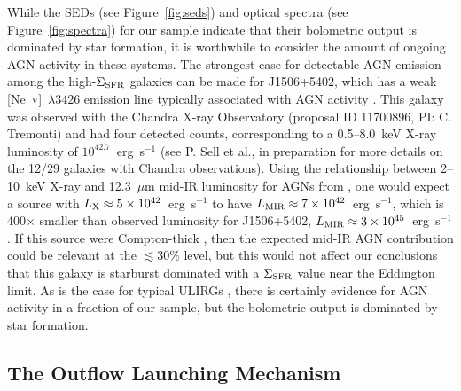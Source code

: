 \documentclass[apj]{emulateapj}
\newcommand{\nev}{[\textrm{Ne}~\textsc{v}]}
\newcommand{\sigmasfr}{\Sigma_{\textnormal{\scriptsize{SFR}}}}
\begin{document}
While the SEDs (see Figure~\ref{fig:seds}) and optical spectra (see
Figure~\ref{fig:spectra}) for our sample indicate that their
bolometric output is dominated by star formation, it is worthwhile to
consider the amount of ongoing AGN activity in these systems.  The
strongest case for detectable AGN emission among the high-$\sigmasfr$
galaxies can be made for J1506+5402, which has a weak
\nev~$\lambda3426$ emission line typically associated with AGN
activity \citep[e.g., ][]{abe08}.  This galaxy was observed with the
Chandra X-ray Observatory (proposal ID 11700896, PI: C. Tremonti) and
had four detected counts, corresponding to a 0.5--8.0~keV X-ray
luminosity of $10^{42.7}$~erg~s$^{-1}$ (see P. Sell et al., in
preparation for more details on the 12/29 galaxies with Chandra
observations).  Using the relationship between 2--10~keV X-ray and
12.3~$\mu$m mid-IR luminosity for AGNs from \citet{gan09}, one would
expect a source with
$L_{\textnormal{\scriptsize{X}}}\approx5\times10^{42}$~erg~s$^{-1}$ to
have
$L_{\textnormal{\scriptsize{MIR}}}\approx7\times10^{42}$~erg~s$^{-1}$,
which is 400$\times$ smaller than observed luminosity for J1506+5402,
$L_{\textnormal{\scriptsize{MIR}}}\approx3\times10^{45}$~erg~s$^{-1}$.
If this source were Compton-thick \citep[e.g., the typical 2--10~keV
  attenuation for local Compton-thick AGNs is a factor of
  100;][]{dia09}, then the expected mid-IR AGN contribution could be
relevant at the $\lesssim$30\% level, but this would not affect our
conclusions that this galaxy is starburst dominated with a $\sigmasfr$
value near the Eddington limit.  As is the case for typical ULIRGs
\citep[e.g.,][]{far07}, there is certainly evidence for AGN activity
in a fraction of our sample, but the bolometric output is dominated by
star formation.


\subsection{The Outflow Launching Mechanism}
\end{document}
